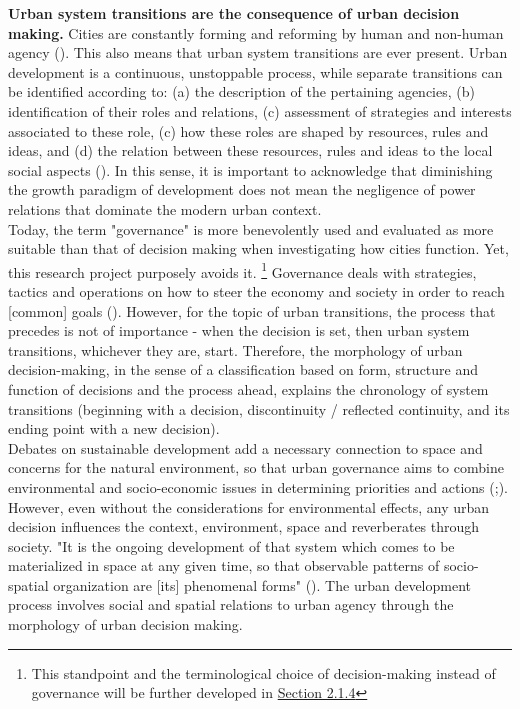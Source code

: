 \documentclass[11pt]{report}
\begin{document}
{{\textbf{Urban system transitions are the consequence of urban decision making.}
Cities are constantly forming and reforming by human and non-human agency (\href{Portugali}{\citealt{portugali_complexity_2012}}).
This also means that urban system transitions are ever present. Urban development is a continuous, unstoppable process, while separate transitions can be identified according to: (a) the description of the pertaining agencies, (b) identification of their roles and relations, (c) assessment of strategies and interests associated to these role, (c) how these roles are shaped by resources, rules and ideas, and (d) the relation between these resources, rules and ideas to the local social aspects  (\href{Healey}{\citealt{healey_institutional_1992}}).
In this sense, it is important to acknowledge that diminishing the growth paradigm of development does not mean the negligence of power relations that dominate the modern urban context. 
\\

Today, the term "governance" is more benevolently used and evaluated as more suitable than that of decision making when investigating how cities function.
Yet, this research project purposely avoids it.
\footnote{This standpoint and the terminological choice of decision-making instead of governance will be further developed in \href{Section 2.1.4}{Section 2.1.4}} 
Governance deals with strategies, tactics and operations on how to steer the economy and society in order to reach [common] goals (\href{Pierre}{\citealt{pierre_governance_2000}}).
However, for the topic of urban transitions, the process that precedes is not of importance - when the decision is set, then urban system transitions, whichever they are, start. Therefore, the morphology of urban decision-making, in the sense of a classification based on form, structure and function of decisions and the process ahead, explains the chronology of system transitions (beginning with a decision, discontinuity / reflected continuity, and its ending point with a new decision).
\\

Debates on sustainable development add a necessary connection to space and concerns for the natural environment, so that urban governance aims to combine environmental and socio-economic issues in determining priorities and actions (\href{ORiordan}{\citealt{oriordan_challenge_1989}};\href{Hopwood}{\citealt{hopwood_sustainable_2005}}).
However, even without the considerations for environmental effects, any urban decision influences the context, environment, space and reverberates through society.
"It is the ongoing development of that system which comes to be materialized in space at any given time, so that observable patterns of socio-spatial organization are [its] phenomenal forms" (\href{Gottdiener}{\citealt{gottdiener_social_2010}}).
The urban development process involves social and spatial relations to urban agency through the morphology of urban decision making.
\\

}}
\end{document}
